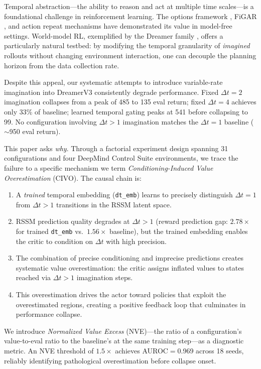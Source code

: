 \documentclass[letterpaper]{article}
\newcommand{\civo}{CIVO\xspace}
\newcommand{\nve}{NVE\xspace}
\newcommand{\dtemb}{\texttt{dt\_emb}\xspace}
\begin{document}
Temporal abstraction---the ability to reason and act at multiple time scales---is a foundational challenge in reinforcement learning. The options framework \citep{sutton1999options}, FiGAR \citep{sharma2017figar}, and action repeat mechanisms have demonstrated its value in model-free settings. World-model RL, exemplified by the Dreamer family \citep{hafner2020dreamerv1,hafner2021dreamerv2,hafner2023dreamerv3}, offers a particularly natural testbed: by modifying the temporal granularity of \emph{imagined} rollouts without changing environment interaction, one can decouple the planning horizon from the data collection rate.

Despite this appeal, our systematic attempts to introduce variable-rate imagination into DreamerV3 consistently degrade performance. Fixed $\Delta t=2$ imagination collapses from a peak of 485 to 135 eval return; fixed $\Delta t=4$ achieves only 33\% of baseline; learned temporal gating peaks at 541 before collapsing to 99. No configuration involving $\Delta t>1$ imagination matches the $\Delta t=1$ baseline ($\sim$950 eval return).

This paper asks \emph{why}. Through a factorial experiment design spanning 31 configurations and four DeepMind Control Suite environments, we trace the failure to a specific mechanism we term \emph{Conditioning-Induced Value Overestimation} (\civo). The causal chain is:
\begin{enumerate}[nosep]
    \item A \emph{trained} temporal embedding (\dtemb) learns to precisely distinguish $\Delta t=1$ from $\Delta t>1$ transitions in the RSSM latent space.
    \item RSSM prediction quality degrades at $\Delta t>1$ (reward prediction gap: $2.78\times$ for trained \dtemb vs.\ $1.56\times$ baseline), but the trained embedding enables the critic to condition on $\Delta t$ with high precision.
    \item The combination of precise conditioning and imprecise predictions creates systematic value overestimation: the critic assigns inflated values to states reached via $\Delta t>1$ imagination steps.
    \item This overestimation drives the actor toward policies that exploit the overestimated regions, creating a positive feedback loop that culminates in performance collapse.
\end{enumerate}

We introduce \emph{Normalized Value Excess} (\nve)---the ratio of a configuration's value-to-eval ratio to the baseline's at the same training step---as a diagnostic metric. An \nve threshold of $1.5\times$ achieves AUROC$=$0.969 across 18 seeds, reliably identifying pathological overestimation before collapse onset.
\end{document}
